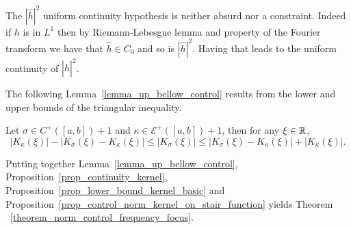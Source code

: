 The $|\hat{h}|^2$ uniform continuity hypothesis is neither absurd nor a constraint. Indeed if $h$ is in $L^1$ then by Riemann-Lebesgue lemma and property of the  Fourier transform we have that $\hat{h}\in C_0$ and so is $|\hat{h}|^2$. Having that leads to the uniform continuity of $|\hat{h}|^2$.

The following Lemma~\ref{lemma_up_bellow_control} results from the lower and upper bounds of the triangular inequality.

\begin{lemma}\label{lemma_up_bellow_control}
	Let $\sigma\in C^+([a,b])+1$ and $\kappa\in\mathcal{E}^+([a,b])+1$, then for any $\xi\in\mathbb{R}$,
	\begin{equation}
		|K_\kappa(\xi)|-|K_\sigma(\xi)-K_\kappa(\xi)| \leqslant |K_\sigma(\xi)| \leqslant |K_\sigma(\xi)-K_\kappa(\xi)| + |K_\kappa(\xi)|.
	\end{equation}
\end{lemma}

Putting together Lemma~\ref{lemma_up_bellow_control}, Proposition~\ref{prop_continuity_kernel}, Proposition~\ref{prop_lower_bound_kernel_basic} and Proposition~\ref{prop_control_norm_kernel_on_stair_function} yields Theorem ~\ref{theorem_norm_control_frequency_focus}.


